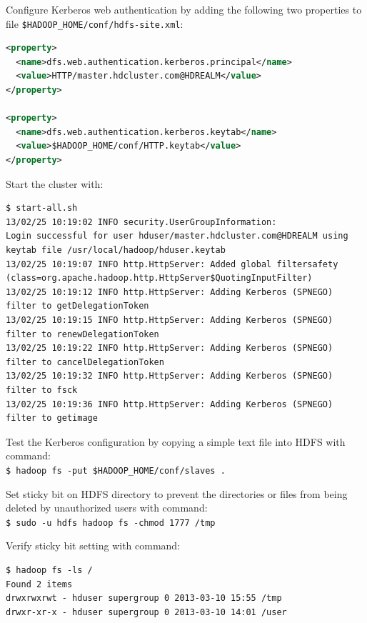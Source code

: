 Configure Kerberos web authentication by adding the following two properties to file \verb|$HADOOP_HOME/conf/hdfs-site.xml|:
\lstset{style=bashstyle}
\begin{lstlisting}[language=XML]
<property>
  <name>dfs.web.authentication.kerberos.principal</name>
  <value>HTTP/master.hdcluster.com@HDREALM</value>
</property>

<property>
  <name>dfs.web.authentication.kerberos.keytab</name>
  <value>$HADOOP_HOME/conf/HTTP.keytab</value>
</property>
\end{lstlisting}

Start the cluster with:
\lstset{style=bashstyle}
\begin{lstlisting}
$ start-all.sh
13/02/25 10:19:02 INFO security.UserGroupInformation:
Login successful for user hduser/master.hdcluster.com@HDREALM using keytab file /usr/local/hadoop/hduser.keytab
13/02/25 10:19:07 INFO http.HttpServer: Added global filtersafety (class=org.apache.hadoop.http.HttpServer$QuotingInputFilter)
13/02/25 10:19:12 INFO http.HttpServer: Adding Kerberos (SPNEGO) filter to getDelegationToken
13/02/25 10:19:15 INFO http.HttpServer: Adding Kerberos (SPNEGO) filter to renewDelegationToken
13/02/25 10:19:22 INFO http.HttpServer: Adding Kerberos (SPNEGO) filter to cancelDelegationToken
13/02/25 10:19:32 INFO http.HttpServer: Adding Kerberos (SPNEGO) filter to fsck
13/02/25 10:19:36 INFO http.HttpServer: Adding Kerberos (SPNEGO) filter to getimage
\end{lstlisting}

Test the Kerberos configuration by copying a simple text file into HDFS with command: \\
\verb|$ hadoop fs -put $HADOOP_HOME/conf/slaves .|

Set sticky bit on HDFS directory to prevent the directories or files from being deleted by unauthorized users with command: \\
\verb|$ sudo -u hdfs hadoop fs -chmod 1777 /tmp|

Verify sticky bit setting with command:
\begin{verbatim}
$ hadoop fs -ls /
Found 2 items
drwxrwxrwt - hduser supergroup 0 2013-03-10 15:55 /tmp
drwxr-xr-x - hduser supergroup 0 2013-03-10 14:01 /user
\end{verbatim}


